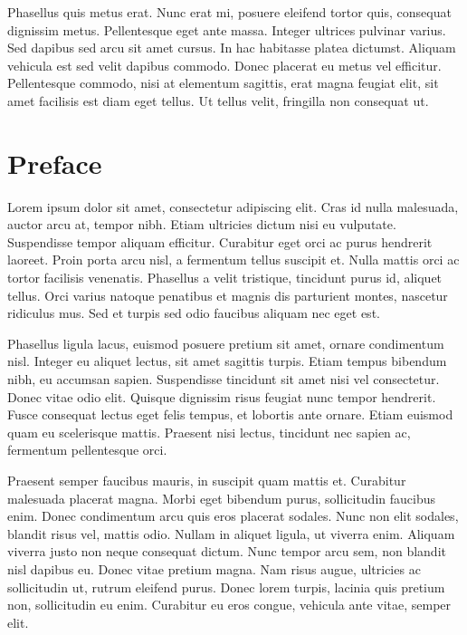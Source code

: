\documentclass[
]{article}
\begin{document}
Phasellus quis metus erat. Nunc erat mi, posuere eleifend tortor quis, consequat dignissim metus. Pellentesque eget ante massa. Integer ultrices pulvinar varius. Sed dapibus sed arcu sit amet cursus. In hac habitasse platea dictumst. Aliquam vehicula est sed velit dapibus commodo. Donec placerat eu metus vel efficitur. Pellentesque commodo, nisi at elementum sagittis, erat magna feugiat elit, sit amet facilisis est diam eget tellus. Ut tellus velit, fringilla non consequat ut.

\clearpage

\section*{Preface}

Lorem ipsum dolor sit amet, consectetur adipiscing elit. Cras id nulla malesuada, auctor arcu at, tempor nibh. Etiam ultricies dictum nisi eu vulputate. Suspendisse tempor aliquam efficitur. Curabitur eget orci ac purus hendrerit laoreet. Proin porta arcu nisl, a fermentum tellus suscipit et. Nulla mattis orci ac tortor facilisis venenatis. Phasellus a velit tristique, tincidunt purus id, aliquet tellus. Orci varius natoque penatibus et magnis dis parturient montes, nascetur ridiculus mus. Sed et turpis sed odio faucibus aliquam nec eget est.

Phasellus ligula lacus, euismod posuere pretium sit amet, ornare condimentum nisl. Integer eu aliquet lectus, sit amet sagittis turpis. Etiam tempus bibendum nibh, eu accumsan sapien. Suspendisse tincidunt sit amet nisi vel consectetur. Donec vitae odio elit. Quisque dignissim risus feugiat nunc tempor hendrerit. Fusce consequat lectus eget felis tempus, et lobortis ante ornare. Etiam euismod quam eu scelerisque mattis. Praesent nisi lectus, tincidunt nec sapien ac, fermentum pellentesque orci.

Praesent semper faucibus mauris, in suscipit quam mattis et. Curabitur malesuada placerat magna. Morbi eget bibendum purus, sollicitudin faucibus enim. Donec condimentum arcu quis eros placerat sodales. Nunc non elit sodales, blandit risus vel, mattis odio. Nullam in aliquet ligula, ut viverra enim. Aliquam viverra justo non neque consequat dictum. Nunc tempor arcu sem, non blandit nisl dapibus eu. Donec vitae pretium magna. Nam risus augue, ultricies ac sollicitudin ut, rutrum eleifend purus. Donec lorem turpis, lacinia quis pretium non, sollicitudin eu enim. Curabitur eu eros congue, vehicula ante vitae, semper elit.
\end{document}
